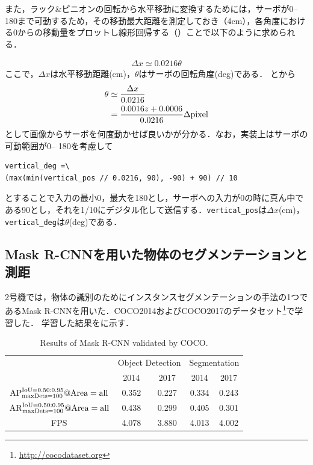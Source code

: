 また，ラック\&ピニオンの回転から水平移動に変換するためには，サーボが0\deg -- 180\deg まで可動するため，その移動最大距離を測定しておき（4cm），各角度における0\deg からの移動量をプロットし線形回帰する（）ことで以下のように求められる．

\begin{align}\label{eq:スライド角度}
\Delta x \simeq 0.0216 \theta
\end{align}
ここで，$\Delta x$は水平移動距離(cm)，$\theta$はサーボの回転角度(deg)である．
とから
\begin{align}
\theta & \simeq \dfrac{\Delta x}{0.0216} \\
& = \dfrac{0.0016z + 0.0006}{0.0216} \Delta \rm{pixel} \\
\end{align}
として画像からサーボを何度動かせば良いかが分かる．なお，実装上はサーボの可動範囲が0\deg -- 180\deg を考慮して
\begin{lstlisting}[label=code:servo]
vertical_deg =\
(max(min(vertical_pos // 0.0216, 90), -90) + 90) // 10
\end{lstlisting}
とすることで入力の最小0，最大を180とし，サーボへの入力が0の時に真ん中である90\deg とし，それを1/10にデジタル化して送信する．\texttt{vertical\_pos}は$\Delta x$(cm)，\texttt{vertical\_deg}は$\theta$(deg)である．


\subsection{Mask R-CNNを用いた物体のセグメンテーションと測距}\label{sec:mrcnn学習}
2号機では，物体の識別のためにインスタンスセグメンテーションの手法の1つであるMask R-CNNを用いた．COCO2014およびCOCO2017のデータセット\footnote{\url{http://cocodataset.org}}で学習した．
学習した結果を\tab{MSCOCO評価}に示す．

\begin{table}[H]
    \centering
    \caption{Results of Mask R-CNN validated by COCO.}
    \begin{tabular}{ccccc}\toprule
        & \multicolumn{2}{c}{Object Detection} & \multicolumn{2}{c}{Segmentation} \\ 
        & 2014 & 2017 & 2014 & 2017 \\ \midrule
        $\rm{AP}^{\rm{IoU}=0.50:0.95} _{\rm maxDets=100} @Area=all$ & 0.352 & 0.227 & 0.334 & 0.243 \\ 
        $\rm{AR}^{\rm{IoU}=0.50:0.95} _{\rm maxDets=100} @Area=all$ & 0.438 & 0.299 & 0.405 & 0.301 \\ 
        FPS & 4.078 & 3.880 & 4.013 & 4.002 \\ \bottomrule
    \end{tabular} 
    \label{tab:MSCOCO評価}
\end{table}

